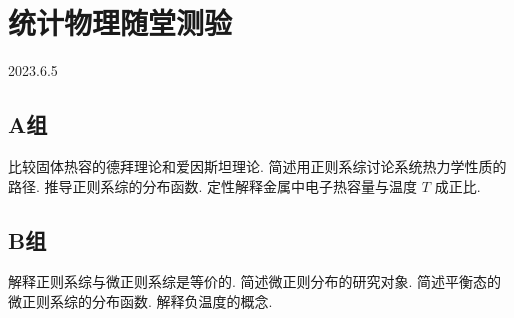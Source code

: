 \section{统计物理随堂测验}
2023.6.5
\subsection{A组}
\begin{questions}
  \qt 比较固体热容的德拜理论和爱因斯坦理论.
  \qt 简述用正则系综讨论系统热力学性质的路径.
  \qt 推导正则系综的分布函数.
  定性解释金属中电子热容量与温度 $T$ 成正比.
\end{questions}
\subsection{B组}
\begin{questions}
  \qt 解释正则系综与微正则系综是等价的.
  \qt 简述微正则分布的研究对象.
  \qt 简述平衡态的微正则系综的分布函数.
  \qt 解释负温度的概念.
\end{questions}